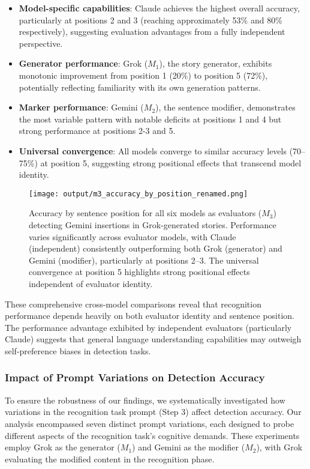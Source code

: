 \documentclass{article}
\begin{document}
\begin{itemize}
    \item \textbf{Model-specific capabilities}: Claude achieves the highest overall accuracy, particularly at positions 2 and 3 (reaching approximately 53\% and 80\% respectively), suggesting evaluation advantages from a fully independent perspective.
    \item \textbf{Generator performance}: Grok ($M_1$), the story generator, exhibits monotonic improvement from position 1 (20\%) to position 5 (72\%), potentially reflecting familiarity with its own generation patterns.
    \item \textbf{Marker performance}: Gemini ($M_2$), the sentence modifier, demonstrates the most variable pattern with notable deficits at positions 1 and 4 but strong performance at positions 2-3 and 5.
    \item \textbf{Universal convergence}: All models converge to similar accuracy levels (70--75\%) at position 5, suggesting strong positional effects that transcend model identity.
\end{itemize}

\begin{figure}[ht]
    \centering
    \texttt{[image: output/m3\_accuracy\_by\_position\_renamed.png]}
    \caption{Accuracy by sentence position for all six models as evaluators ($M_3$) detecting Gemini insertions in Grok-generated stories. Performance varies significantly across evaluator models, with Claude (independent) consistently outperforming both Grok (generator) and Gemini (modifier), particularly at positions 2--3. The universal convergence at position 5 highlights strong positional effects independent of evaluator identity.}
    \label{fig:accuracy_by_position}
\end{figure}

These comprehensive cross-model comparisons reveal that recognition performance depends heavily on both evaluator identity and sentence position. The performance advantage exhibited by independent evaluators (particularly Claude) suggests that general language understanding capabilities may outweigh self-preference biases in detection tasks.

\subsubsection{Impact of Prompt Variations on Detection Accuracy}

To ensure the robustness of our findings, we systematically investigated how variations in the recognition task prompt (Step 3) affect detection accuracy. Our analysis encompassed seven distinct prompt variations, each designed to probe different aspects of the recognition task's cognitive demands. These experiments employ Grok as the generator ($M_1$) and Gemini as the modifier ($M_2$), with Grok evaluating the modified content in the recognition phase.
\end{document}

